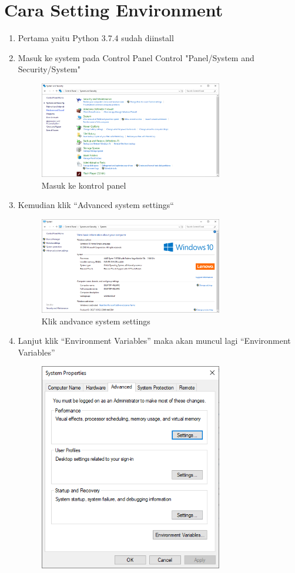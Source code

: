 \section {Cara Setting Environment}
\begin{enumerate}
    \item Pertama yaitu Python 3.7.4 sudah diinstall
    \item Masuk ke system pada Control Panel Control "Panel/System and Security/System"
    \begin{figure}[!htpb]
			\includegraphics[width=8cm]{figures/6.PNG}
			\centering
			\caption{Masuk ke kontrol panel}
		\end{figure}
    \item Kemudian klik “Advanced system settings“
		\begin{figure}[!htpb]
			\includegraphics[width=8cm]{figures/7.PNG}
			\centering
			\caption{Klik andvance system settings}
		\end{figure}
		\newpage
	\item  Lanjut klik “Environment Variables” maka akan muncul lagi “Environment Variables”
    \begin{figure}[!htpb]
			\includegraphics[width=8cm]{figures/8.PNG}

\end{figure}
\end{enumerate}
